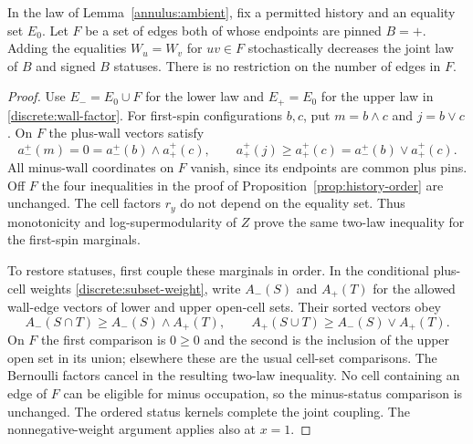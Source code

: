 \begin{lemma}
\label{annulus:plus-equalities}
In the law of Lemma~\ref{annulus:ambient}, fix a permitted history
and an equality set $E_0$. Let $F$ be a set of edges both of whose
endpoints are pinned $B=+$. Adding the equalities $W_u=W_v$ for
$uv\in F$ stochastically decreases the joint law of $B$ and signed
$B$ statuses. There is no restriction on the number of edges in $F$.
\end{lemma}
\begin{proof}
Use $E_-=E_0\cup F$ for the lower law and $E_+=E_0$ for the upper
law in \eqref{discrete:wall-factor}. For first-spin configurations
$b,c$, put $m=b\wedge c$ and $j=b\vee c$. On $F$ the plus-wall
vectors satisfy
\[
 a_-^+(m)=0=a_-^+(b)\wedge a_+^+(c),\qquad
 a_+^+(j)\geq a_+^+(c)=a_-^+(b)\vee a_+^+(c).
\]
All minus-wall coordinates on $F$ vanish, since its endpoints are
common plus pins. Off $F$ the four inequalities in the proof of
Proposition~\ref{prop:history-order} are unchanged. The cell factors
$r_y$ do not depend on the equality set. Thus monotonicity and
log-supermodularity of $Z$ prove the same two-law inequality for the
first-spin marginals.

To restore statuses, first couple these marginals in order. In the
conditional plus-cell weights \eqref{discrete:subset-weight}, write
$A_-(S)$ and $A_+(T)$ for the allowed wall-edge vectors of lower and
upper open-cell sets. Their sorted vectors obey
\[
 A_-(S\cap T)\geq A_-(S)\wedge A_+(T),\qquad
 A_+(S\cup T)\geq A_-(S)\vee A_+(T).
\]
On $F$ the first comparison is $0\geq0$ and the second is the
inclusion of the upper open set in its union; elsewhere these are the
usual cell-set comparisons. The Bernoulli factors cancel in the
resulting two-law inequality. No cell containing an edge of $F$ can
be eligible for minus occupation, so the minus-status comparison is
unchanged. The ordered status kernels complete the joint coupling.
The nonnegative-weight argument applies also at $x=1$.
\end{proof}

